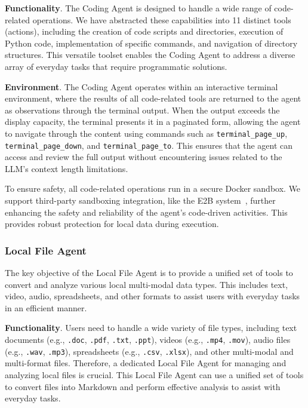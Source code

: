 \noindent \textbf{Functionality}. The Coding Agent is designed to handle a wide range of code-related operations. We have abstracted these capabilities into 11 distinct tools (actions), including the creation of code scripts and directories, execution of Python code, implementation of specific commands, and navigation of directory structures. This versatile toolset enables the Coding Agent to address a diverse array of everyday tasks that require programmatic solutions.

\noindent \textbf{Environment}. The Coding Agent operates within an interactive terminal environment, where the results of all code-related tools are returned to the agent as observations through the terminal output. When the output exceeds the display capacity, the terminal presents it in a paginated form, allowing the agent to navigate through the content using commands such as \texttt{terminal\_page\_up}, \texttt{terminal\_page\_down}, and \texttt{terminal\_page\_to}. This ensures that the agent can access and review the full output without encountering issues related to the LLM's context length limitations.

To ensure safety, all code-related operations run in a secure Docker sandbox. We support third-party sandboxing integration, like the E2B system~\cite{e2b2023}, further enhancing the safety and reliability of the agent's code-driven activities. This provides robust protection for local data during execution.

\subsubsection{Local File Agent}
The key objective of the Local File Agent is to provide a unified set of tools to convert and analyze various local multi-modal data types. This includes text, video, audio, spreadsheets, and other formats to assist users with everyday tasks in an efficient manner.

\noindent \textbf{Functionality}. Users need to handle a wide variety of file types, including text documents (e.g., \texttt{.doc}, \texttt{.pdf}, \texttt{.txt}, \texttt{.ppt}), videos (e.g., \texttt{.mp4}, \texttt{.mov}), audio files (e.g., \texttt{.wav}, \texttt{.mp3}), spreadsheets (e.g., \texttt{.csv}, \texttt{.xlsx}), and other multi-modal and multi-format files. Therefore, a dedicated Local File Agent for managing and analyzing local files is crucial. This Local File Agent can use a unified set of tools to convert files into Markdown and perform effective analysis to assist with everyday tasks.


